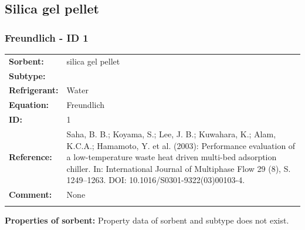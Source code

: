 \subsection{Silica gel pellet }
%
\subsubsection{Freundlich - ID 1}
%
\begin{tabular}[l]{|lp{11.5cm}|}
\hline
\addlinespace

\textbf{Sorbent:} & silica gel pellet \\
\textbf{Subtype:} &  \\
\textbf{Refrigerant:} & Water \\
\textbf{Equation:} & Freundlich \\
\textbf{ID:} & 1 \\
\textbf{Reference:} & Saha, B. B.; Koyama, S.; Lee, J. B.; Kuwahara, K.; Alam, K.C.A.; Hamamoto, Y. et al. (2003): Performance evaluation of a low-temperature waste heat driven multi-bed adsorption chiller. In: International Journal of Multiphase Flow 29 (8), S. 1249–1263. DOI: 10.1016/S0301-9322(03)00103-4. \\
\textbf{Comment:} & None \\

\addlinespace
\hline
\end{tabular}
\newline

\textbf{Properties of sorbent:}
\newline
%
Property data of sorbent and subtype does not exist.

